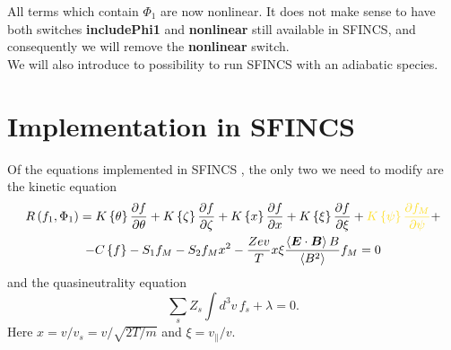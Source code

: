 \documentclass[12pt]{article}
\newcommand{\p}{\partial}
\begin{document}
\noindent All terms which contain $\Phi_1$ are now nonlinear. 
It does not make sense to have both switches \textbf{includePhi1} and \textbf{nonlinear} still available in SFINCS, 
and consequently we will remove the \textbf{nonlinear} switch.
\\

\noindent We will also introduce to possibility to run SFINCS with an adiabatic species. 

\newpage















\section*{Implementation in SFINCS}
Of the equations implemented in SFINCS \cite{SFINCStechnicalDoc}, the only two we need to modify are the kinetic equation
\begin{multline} 
R\left(f_{1}, \Phi_1\right) = 
K \left\{\theta\right\} \frac{\p f}{\p \theta} + K \left\{\zeta\right\} \frac{\p f}{\p \zeta} + 
K \left\{x\right\} \frac{\p f}{\p x} + K \left\{\xi\right\} \frac{\p f}{\p \xi} + 
\textcolor{Goldenrod}{K \left\{\psi\right\} \frac{\p f_{M}}{\p \psi}} + \\ 
- C \left\{f\right\} - S_{1} f_{M} - S_{2} f_{M} x^2 - \frac{Z e v}{T} x \xi \frac{\left\langle \bm{E} \cdot \bm{B} \right\rangle B}{\left\langle B^2 \right\rangle} f_M = 0
\label{eq:KineticEqSFINCS}
\end{multline}
and the quasineutrality equation
\begin{equation}
\sum_s Z_s \int d^3v \, f_s + \lambda = 0.
\label{eq:QuasineutralityEqSFINCS}
\end{equation}
Here $x = v/v_s = v / \sqrt{2T/m}$ and $\xi = v_\| / v$.\\
\end{document}
